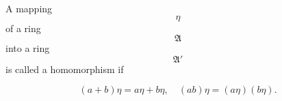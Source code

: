 A mapping $$\eta$$ of a ring $$\mathfrak{A}$$ into a ring $$\mathfrak{A}'$$ is called a homomorphism if

$$(a + b)\eta = a\eta + b\eta, \quad (ab)\eta = (a\eta)(b\eta).$$
